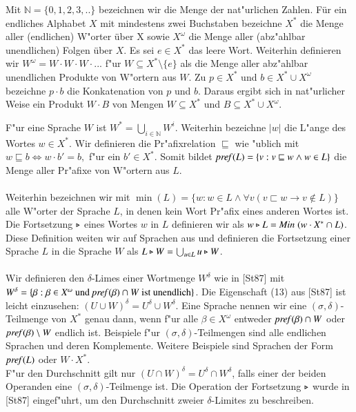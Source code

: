 Mit $\mathbb{N}=\{0,1,2,3,..\}$ bezeichnen wir die Menge der nat"urlichen Zahlen. 
Für ein endliches Alphabet $X$ mit mindestens zwei Buchstaben bezeichne $X^*$ die Menge aller (endlichen) W"orter über X sowie $X^\omega$ die Menge aller (abz"ahlbar unendlichen) Folgen über $X$.
Es sei $e\in X^*$ das leere Wort. Weiterhin definieren wir $W^\omega = W\cdot W\cdot W \cdot ...$ f"ur $W\subseteq X^*\setminus \{e\}$ als die Menge aller abz"ahlbar unendlichen Produkte von W"ortern aus $W$.
Zu $p\in X^*$ und $b\in X^*\cup X^\omega$ bezeichne $p\cdot b$ die Konkatenation von $p$ und $b$. Daraus ergibt sich in nat"urlicher Weise ein Produkt $W\cdot B$ von Mengen $W\subseteq X^*$ und $B\subseteq X^*\cup X^\omega$.

F"ur eine Sprache $W$ ist $W^*=\bigcup_{i\in\mathbb{N}} W^i$. Weiterhin bezeichne $\vert w\vert$ die L"ange des Wortes $w\in X^*$.
Wir definieren die Pr"afixrelation $\sqsubseteq$ wie "ublich mit $w\sqsubseteq b \Leftrightarrow w\cdot b' = b,$ f"ur ein $b'\in X^*$.
Somit bildet $\mathit{pref{(}}L) = \{v:v\sqsubseteq w \wedge w\in L\}$ die Menge aller Pr"afixe von W"ortern aus $L$.\\\\
Weiterhin bezeichnen wir mit $\min(L) = \{w:w\in L \wedge \forall v( v\sqsubset w \to v\notin L)\}$ alle W"orter der Sprache $L$, in denen kein Wort Pr"afix eines anderen Wortes ist.
Die Fortsetzung $\triangleright$ eines Wortes $w$ in $L$ definieren wir als $w\triangleright L = \mathit{Min}\;(w\cdot X^* \cap L)$. Diese Definition weiten wir auf Sprachen aus und definieren
die Fortsetzung einer Sprache $L$ in die Sprache $W$ als $L\triangleright W = \bigcup_{u\in L} u\triangleright W$.\\\\
Wir definieren den $\delta$-Limes einer Wortmenge $W ^\delta$ wie in [St87] mit\\$W^\delta = \{\beta : \beta \in X^\omega \text{ und }\mathit{pref{(}}\beta)\cap W \text{ ist unendlich}\}$.
Die Eigenschaft (13) aus [St87] ist leicht einzusehen: $(U \cup W)^\delta = U^\delta \cup W^\delta$.	Eine Sprache nennen wir eine $(\sigma,\delta)$-Teilmenge von $X^*$ genau dann, wenn f"ur alle $\beta \in X^\omega$ entweder $\mathit{pref{(}}\beta)\cap W$ oder $\mathit{pref{(}}\beta)\setminus W$ endlich ist.
Beispiele f"ur $(\sigma,\delta)$-Teilmengen sind alle endlichen Sprachen und deren Komplemente. Weitere Beispiele sind Sprachen der Form $\mathit{pref{(}}L)$ oder $W\cdot X^*$.\\
F"ur den Durchschnitt gilt nur $(U\cap W)^\delta = U^\delta \cap W^\delta$, falls einer der beiden Operanden eine $(\sigma,\delta)$-Teilmenge ist.
Die Operation der Fortsetzung $\triangleright$ wurde in [St87] eingef"uhrt, um den Durchschnitt zweier $\delta$-Limites zu beschreiben.
